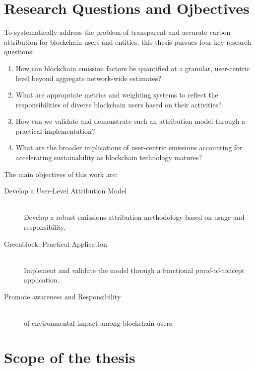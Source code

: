 \documentclass[11pt]{report}
\begin{document}
\section{Research Questions and Ojbectives}

To systematically address the problem of transparent and accurate carbon attribution for blockchain users and entities, this thesis pursues four key research questions:

\begin{enumerate}
    \item How can blockchain emission factors be quantified at a granular, user-centric level beyond aggregate network-wide estimates?
    \item What are appropriate metrics and weighting systems to reflect the responsibilities of diverse blockchain users based on their activities?
    \item How can we validate and demonstrate such an attribution model through a practical implementation?
    \item What are the broader implications of user-centric emissions accounting for accelerating sustainability as blockchain technology matures? 
\end{enumerate}

The main objectives of this work are:

\begin{description}

    \item [Develop a User-Level Attribution Model] \hfill \\
          Develop a robust emissions attribution methodology based on usage and responsibility.
    \item [Greenblock: Practical Application] \hfill \\
          Implement and validate the model through a functional proof-of-concept application.
    \item [Promote awareness and Responsibility] \hfill \\
          of environmental impact among blockchain users.
\end{description}

\section{Scope of the thesis}
\end{document}

